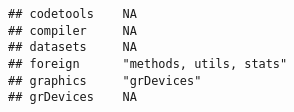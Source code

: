 \documentclass[]{article}
\begin{document}
\begin{verbatim}
## codetools    NA                                                                                                                                                                                                                                                                                                                                                                                                                                                                                    
## compiler     NA                                                                                                                                                                                                                                                                                                                                                                                                                                                                                    
## datasets     NA                                                                                                                                                                                                                                                                                                                                                                                                                                                                                    
## foreign      "methods, utils, stats"                                                                                                                                                                                                                                                                                                                                                                                                                                                               
## graphics     "grDevices"                                                                                                                                                                                                                                                                                                                                                                                                                                                                           
## grDevices    NA                                                                                                                                                                                                                                                                                                                                                                                                                                                                                    

\end{verbatim}
\end{document}
